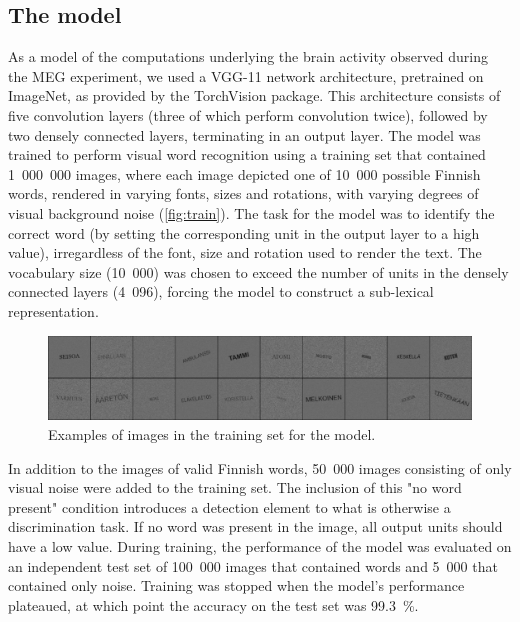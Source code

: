 \documentclass[a4paper, 10pt]{vanvliet_paper}
\begin{document}
\subsection{The model}

As a model of the computations underlying the brain activity observed during the \gls{MEG} experiment, we used a \textsc{VGG}-11\cite{Szegedy2015} network architecture, pretrained on ImageNet\cite{Russakovsky2015}, as provided by the TorchVision package\cite{Marcel2010}.
This architecture consists of five convolution layers (three of which perform convolution twice), followed by two densely connected layers, terminating in an output layer.
The model was trained to perform visual word recognition using a training set that contained 1~000~000 images, where each image depicted one of 10~000 possible Finnish words, rendered in varying fonts, sizes and rotations, with varying degrees of visual background noise (\autoref{fig:train}).
The task for the model was to identify the correct word (by setting the corresponding unit in the output layer to a high value), irregardless of the font, size and rotation used to render the text.
The vocabulary size (10~000) was chosen to exceed the number of units in the densely connected layers (4~096), forcing the model to construct a sub-lexical representation.

\begin{figure}[b]
    \includegraphics[width=\textwidth]{train.png}
    \caption{Examples of images in the training set for the model.}\label{fig:train}
\end{figure}

In addition to the images of valid Finnish words, 50~000 images consisting of only visual noise were added to the training set.
The inclusion of this "no word present" condition introduces a detection element to what is otherwise a discrimination task.
If no word was present in the image, all output units should have a low value.
During training, the performance of the model was evaluated on an independent test set of 100~000 images that contained words and 5~000 that contained only noise.
Training was stopped when the model's performance plateaued, at which point the accuracy on the test set was \SI{99.3}{\percent}.
\end{document}
